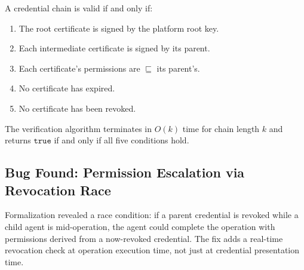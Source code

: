 \begin{theorem}
A credential chain is valid if and only if:
\begin{enumerate}[leftmargin=1.4em]
    \item The root certificate is signed by the platform root key.
    \item Each intermediate certificate is signed by its parent.
    \item Each certificate's permissions are $\sqsubseteq$ its parent's.
    \item No certificate has expired.
    \item No certificate has been revoked.
\end{enumerate}
The verification algorithm terminates in $O(k)$ time for chain length $k$ and
returns $\texttt{true}$ if and only if all five conditions hold.
\end{theorem}

\subsection{Bug Found: Permission Escalation via Revocation Race}

Formalization revealed a race condition: if a parent credential is revoked
while a child agent is mid-operation, the agent could complete the operation
with permissions derived from a now-revoked credential. The fix adds a
real-time revocation check at operation execution time, not just at credential
presentation time.

